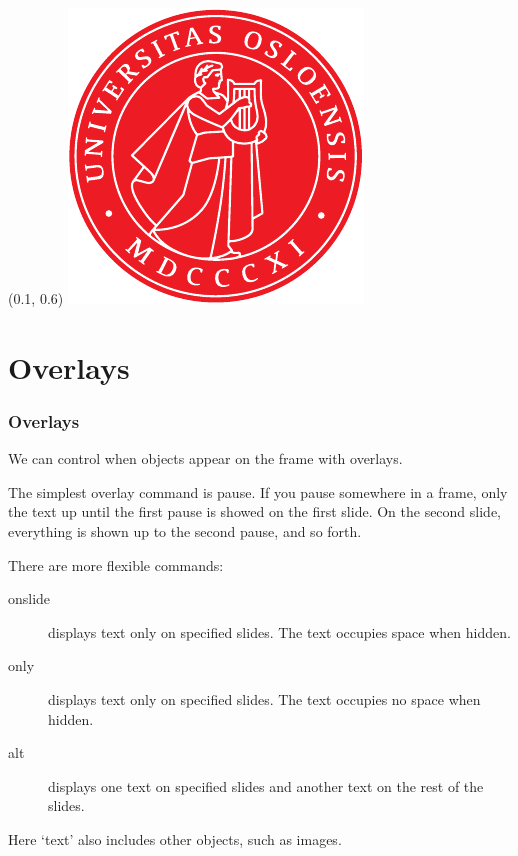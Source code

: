 \documentclass[UKenglish, unknownkeysallowed]{beamer}
\begin{document}
\begin{frame}
    \begin{textblock}{0.2}(0.1, 0.6)
        \includegraphics[width = \textwidth]{apollon}
    \end{textblock}
\end{frame}


\section{Overlays}


\begin{frame}
    \frametitle{Overlays}

    We can control when objects appear on the frame with \alert{overlays}.

    \pause
    \medskip

    The simplest overlay command is \alert{pause}.
    If you pause somewhere in a frame,
    only the text up until the first pause is showed on the first slide.
    On the second slide, everything is shown up to the second pause, and so forth.

    \pause
    \medskip
    There are more flexible commands:

    \begin{description}
        \item[onslide]
        displays text only on specified slides.
        The text occupies space when hidden.

        \item[only]
        displays text only on specified slides.
        The text occupies no space when hidden.

        \item[alt]
        displays one text on specified slides and another text on the rest of the slides.
    \end{description}

    Here `text' also includes other objects, such as images.
\end{frame}
\end{document}
